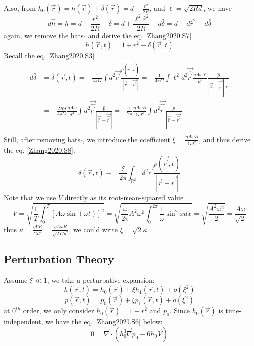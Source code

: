 \documentclass[books,12pt]{elegantpaper}
\newcommand{\ssc}{\subsection}
\begin{document}
Also, from $h_0 (\vec{r}) = h(\vec{r}) + \delta(\vec{r}) = d + \frac{r^2}{2R}$, and $\ell = \sqrt{2Rd}$, we have
$$ d\hat{h} = h = d + \frac{r^2}{2R} - \delta = d + \frac{\ell^2 \hat{r}^2}{2R} - d\hat\delta = d + d \hat{r}^2 - d \hat\delta $$
again, we remove the hats $\hat{}$ and derive the eq. \ref{Zhang2020.S7}
\begin{equation} h(\vec{r},t) = 1 + r^2 - \delta(\vec{r},t) \tag{Zhang2020.S7} \label{Zhang2020.S7} \end{equation}
Recall the eq. \ref{Zhang2020.S3} 
$$ \begin{align}
d\hat\delta &= \delta(\vec{r},t) = - \frac{1}{4\pi G} \int d^2 \vec{r^\prime} \frac{p(\vec{r^\prime},t)}{\left\vert \vec{r} - \vec{r^\prime} \right\vert} = - \frac{1}{4\pi G} \int \ell^2 d^2 \vec{\hat{r^\prime}} \frac{\eta A \omega \ell}{d^2} \frac{\hat{p}}{\left\vert \vec{\hat{r}} - \vec{\hat{r^\prime}} \right\vert \ell} \\
&= - \frac{2Rd}{4\pi G} \frac{\eta A \omega}{d^2} \int d^2 \vec{\hat{r^\prime}} \frac{\hat{p}}{\left\vert \vec{\hat{r}} - \vec{\hat{r^\prime}} \right\vert} = -\frac{1}{2\pi} \frac{\eta A \omega R}{G d^2} \int d^2 \vec{\hat{r^\prime}} \frac{\hat{p}}{\left\vert \vec{\hat{r}} - \vec{\hat{r^\prime}} \right\vert} \\
\end{align} $$
Still, after removing hats $\hat{}$, we introduce the coefficient $\xi = \frac{\eta A \omega R}{G d^2}$, and thus derive the eq. \ref{Zhang2020.S8}:
\begin{equation} \delta(\vec{r},t) = - \frac{\xi}{2 \pi} \int_{\mathbb{R}^2} d^2 \vec{r^\prime} \frac{p(\vec{r^\prime},t)}{\left\vert \vec{r} - \vec{r^\prime} \right\vert} \tag{Zhang2020.S8} \label{Zhang2020.S8} \end{equation}
Note that we use $V$ directly as its root-mean-squared value
$$ V = \sqrt{\frac{1}{T} \int_0^T \left[ A\omega \sin(\omega t) \right]^2} = \sqrt{\frac{\omega}{2\pi} A^2 \omega^2 \int_0^{2\pi} \frac{1}{\omega} \sin^2x dx} = \sqrt{\frac{A^2 \omega^2}{2}} = \frac{A \omega}{\sqrt{2}} $$
thus $\kappa = \frac{\eta V R}{G d^2} = \frac{\eta A \omega R}{\sqrt{2} G d^2}$, we could write $\xi = \sqrt{2} \kappa$.



\ssc{Perturbation Theory}
Assume $\xi \ll 1$, we take a perturbative expansion:
\begin{equation} h(\vec{r},t) = h_0 (\vec{r}) + \xi h_1(\vec{r},t) + o(\xi^2) \tag{Zhang2020.S9} \label{Zhang2020.S9} \end{equation}
\begin{equation} p(\vec{r},t) = p_0 (\vec{r}) + \xi p_1(\vec{r},t) + o(\xi^2) \tag{Zhang2020.S10} \end{equation}
at $0^{th}$ order, we only consider $h_0(\vec{r}) = 1 + r^2$ and $p_0$. Since $h_0(\vec{r})$ is time-independent, we have the eq. \ref{Zhang2020.S6} below:
\begin{equation} 0 = \vec\nabla \cdot \left( h_0^3 \vec\nabla p_0 - 6 h_0 \vec{V} \right) \tag{Zhang2020.S11} \label{Zhang2020.S11} \end{equation}
\end{document}
